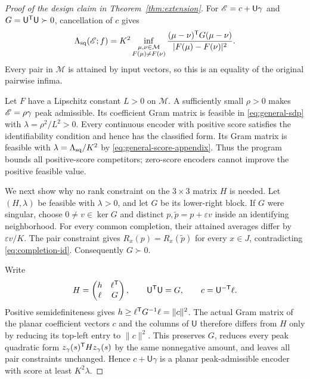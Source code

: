 \begin{proof}[Proof of the design claim in Theorem~\ref{thm:extension}]
For $\mathscr E=c+\mathsf U\gamma$ and $G=\mathsf U^\mathsf T\mathsf U\succ0$, cancellation of $c$ gives
\begin{equation}
 \Lambda_{\mathrm{sq}}(\mathscr E;f)
 =K^2\inf_{\substack{\mu,\nu\in\mathcal M\\F(\mu)\ne F(\nu)}}
 \frac{(\mu-\nu)^\mathsf T G(\mu-\nu)}{|F(\mu)-F(\nu)|^2}.
 \label{eq:general-score-appendix}
\end{equation}
Every pair in $\mathcal M$ is attained by input vectors, so this is an equality of the original pairwise infima.

Let $F$ have a Lipschitz constant $L>0$ on $\mathcal M$. A sufficiently small $\rho>0$ makes $\mathscr E=\rho\gamma$ peak admissible. Its coefficient Gram matrix is feasible in \eqref{eq:general-sdp} with $\lambda=\rho^2/L^2>0$. Every continuous encoder with positive score satisfies the identifiability condition and hence has the classified form. Its Gram matrix is feasible with $\lambda=\Lambda_{\mathrm{sq}}/K^2$ by \eqref{eq:general-score-appendix}. Thus the program bounds all positive-score competitors; zero-score encoders cannot improve the positive feasible value.

We next show why no rank constraint on the $3\times3$ matrix $H$ is needed. Let $(H,\lambda)$ be feasible with $\lambda>0$, and let $G$ be its lower-right block. If $G$ were singular, choose $0\ne v\in\ker G$ and distinct $p,\widetilde p=p+\varepsilon v$ inside an identifying neighborhood. For every common completion, their attained averages differ by $\varepsilon v/K$. The pair constraint gives $R_x(p)=R_x(\widetilde p)$ for every $x\in J$, contradicting \eqref{eq:completion-id}. Consequently $G\succ0$.

Write
$$
 H=\begin{pmatrix}h&\ell^\mathsf T\\\ell&G\end{pmatrix},\qquad
 \mathsf U^\mathsf T\mathsf U=G,\qquad c=\mathsf U^{-\mathsf T}\ell.
$$
Positive semidefiniteness gives $h\ge\ell^\mathsf T G^{-1}\ell=\|c\|^2$. The actual Gram matrix of the planar coefficient vectors $c$ and the columns of $\mathsf U$ therefore differs from $H$ only by reducing its top-left entry to $\|c\|^2$. This preserves $G$, reduces every peak quadratic form $z_\gamma(s)^\mathsf T Hz_\gamma(s)$ by the same nonnegative amount, and leaves all pair constraints unchanged. Hence $c+\mathsf U\gamma$ is a planar peak-admissible encoder with score at least $K^2\lambda$.


\end{proof}
